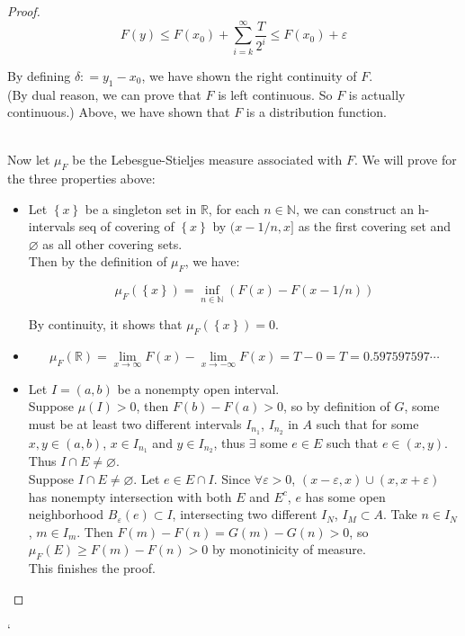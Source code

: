 \begin{proof}
\[F(y) \leq F(x_{0}) + \sum\limits_{i = k}^{\infty}\frac{T}{2^{i}} \leq F(x_{0}) + \varepsilon\]

By defining \(\delta: = y_{1} - x_{0}\), we have shown the right continuity of \(F\).\\
(By dual reason, we can prove that \(F\) is left continuous. So \(F\) is actually continuous.) Above, we have shown that \(F\) is a distribution function.\\
\strut \\
Now let \(\mu_{F}\) be the Lebesgue-Stieljes measure associated with \(F\). We will prove for the three properties above:\\

\begin{itemize}
\item
  Let \(\left\{ x \right\}\) be a singleton set in \(\mathbb{R}\), for each \(n \in \mathbb{N}\), we can construct an h-intervals seq of covering of \(\left\{ x \right\}\) by \((x - 1/n,x\rbrack\) as the first covering set and \(\varnothing\) as all other covering sets.\\
  Then by the definition of \(\mu_{F}\), we have:

  \[\mu_{F}(\left\{ x \right\}) = \inf\limits_{n \in \mathbb{N}}(F(x) - F(x - 1/n))\]

  By continuity, it shows that \(\mu_{F}(\left\{ x \right\}) = 0\).
\item
  \[\mu_{F}(\mathbb{R}) = \lim\limits_{x\rightarrow\infty}F(x) - \lim\limits_{x\rightarrow - \infty}F(x) = T - 0 = T = 0.597597597\cdots\]
\item
  Let \(I = (a,b)\) be a nonempty open interval.\\
  Suppose \(\mu(I) > 0\), then \(F(b) - F(a) > 0\), so by definition of \(G\), some must be at least two different intervals \(I_{n_{1}}\), \(I_{n_{2}}\) in \(A\) such that for some \(x,y \in (a,b)\), \(x \in I_{n_{1}}\) and \(y \in I_{n_{2}}\), thus \(\exists\) some \(e \in E\) such that \(e \in (x,y)\). Thus \(I \cap E \neq \varnothing\).\\
  Suppose \(I \cap E \neq \varnothing\). Let \(e \in E \cap I\). Since \(\forall\varepsilon > 0\), \((x - \varepsilon,x) \cup (x,x + \varepsilon)\) has nonempty intersection with both \(E\) and \(E^{c}\), \(e\) has some open neighborhood \(B_{\varepsilon}(e) \subset I\), intersecting two different \(I_{N}\), \(I_{M} \subset A\). Take \(n \in I_{N}\), \(m \in I_{m}\). Then \(F(m) - F(n) = G(m) - G(n) > 0\), so \(\mu_{F}(E) \geq F(m) - F(n) > 0\) by monotinicity of measure.\\
  This finishes the proof.
\end{itemize}

\end{proof}

`
